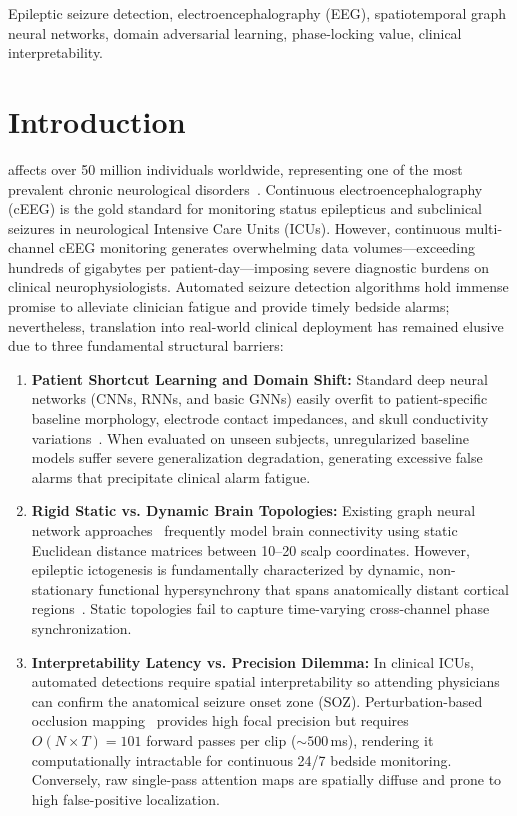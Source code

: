 \documentclass[journal]{IEEEtran}
\begin{document}
\begin{IEEEkeywords}
Epileptic seizure detection, electroencephalography (EEG), spatiotemporal graph neural networks, domain adversarial learning, phase-locking value, clinical interpretability.
\end{IEEEkeywords}

\IEEEpeerreviewmaketitle

\section{Introduction}
 affects over 50 million individuals worldwide, representing one of the most prevalent chronic neurological disorders~\cite{ahmedt2020deep}. Continuous electroencephalography (cEEG) is the gold standard for monitoring status epilepticus and subclinical seizures in neurological Intensive Care Units (ICUs). However, continuous multi-channel cEEG monitoring generates overwhelming data volumes---exceeding hundreds of gigabytes per patient-day---imposing severe diagnostic burdens on clinical neurophysiologists. Automated seizure detection algorithms hold immense promise to alleviate clinician fatigue and provide timely bedside alarms; nevertheless, translation into real-world clinical deployment has remained elusive due to three fundamental structural barriers:

\begin{enumerate}
    \item \textbf{Patient Shortcut Learning and Domain Shift:} Standard deep neural networks (CNNs, RNNs, and basic GNNs) easily overfit to patient-specific baseline morphology, electrode contact impedances, and skull conductivity variations~\cite{saab2020weak}. When evaluated on unseen subjects, unregularized baseline models suffer severe generalization degradation, generating excessive false alarms that precipitate clinical alarm fatigue.
    \item \textbf{Rigid Static vs. Dynamic Brain Topologies:} Existing graph neural network approaches~\cite{tang2022self} frequently model brain connectivity using static Euclidean distance matrices between 10--20 scalp coordinates. However, epileptic ictogenesis is fundamentally characterized by dynamic, non-stationary functional hypersynchrony that spans anatomically distant cortical regions~\cite{lachaux1999measuring}. Static topologies fail to capture time-varying cross-channel phase synchronization.
    \item \textbf{Interpretability Latency vs. Precision Dilemma:} In clinical ICUs, automated detections require spatial interpretability so attending physicians can confirm the anatomical seizure onset zone (SOZ). Perturbation-based occlusion mapping~\cite{tang2022self} provides high focal precision but requires $O(N \times T) = 101$ forward passes per clip ($\sim 500$\,ms), rendering it computationally intractable for continuous 24/7 bedside monitoring. Conversely, raw single-pass attention maps are spatially diffuse and prone to high false-positive localization.
\end{enumerate}
\end{document}
